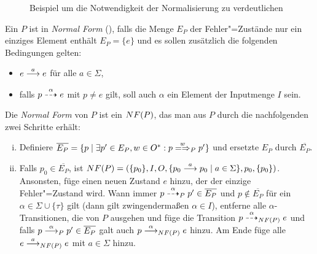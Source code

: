 \begin{figure}[htbp]
  \begin{center}
    \caption{Beispiel um die Notwendigkeit der Normalisierung zu verdeutlichen}
    \label{BspKreuzpConj}
  \end{center}
\end{figure}

\begin{Def}
  \label{normalFormDef}
  Ein \MEIO{} $P$ ist in \emph{Normal Form} (\NF{}), falls die Menge $E_P$ der
  Fehler"=Zustände nur ein einziges Element enthält $E_P=\{e\}$ und es sollen
  zusätzlich die folgenden Bedingungen gelten:
  \begin{itemize}
    \item $e \must[a] e$ für alle $a\in\Sigma$,
    \item falls $p \may[\alpha] e$ mit $p\neq e$ gilt, soll auch $\alpha$ ein
      Element der Inputmenge $I$ sein.
  \end{itemize}
  Die \emph{Normal Form} von $P$ ist ein \MEIO{} $NF (P)$, das man aus $P$
  durch die nachfolgenden zwei Schritte erhält:
  \begin{enumerate}[(i)]
    \item Definiere $\overline{E_P} = \{p \mid \exists p'\in E_P, w\in O^*:
      p\weakmay[w]_P p'\}$ und ersetzte $E_P$ durch $\overline{E_P}$.
    \item Falls $p_0\in \overline{E_P}$, ist $NF(P) = (\{p_0\}, I, O, \{p_0
      \must[a] p_0 \mid a\in\Sigma\}, p_0, \{p_0\})$.\\
      Ansonsten, füge einen neuen Zustand $e$ hinzu, der der einzige
      Fehler"=Zustand wird. Wann immer $p \may[\alpha]_P p'\in \overline{E_P}$
      und $p\notin \overline{E_P}$ für ein $\alpha\in \Sigma \cup \{\tau\}$
      gilt (dann gilt zwingendermaßen $\alpha \in I$), entferne alle
      $\alpha$-Transitionen, die von $P$ ausgehen und füge die Transition
      $p\may[\alpha]_{\NF (P)} e$ und falls $p \must[\alpha]_P p'\in
      \overline{E_P}$ galt auch $p \must[\alpha]_{\NF (P)} e$ hinzu. Am Ende
      füge alle $e\must[a]_{\NF (P)} e$ mit $a\in\Sigma$ hinzu.
  \end{enumerate}
\end{Def}

